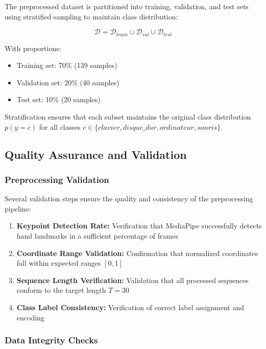 \documentclass[11pt, a4paper]{article}
\begin{document}
The preprocessed dataset is partitioned into training, validation, and test sets using stratified sampling to maintain class distribution:

\begin{equation}
\mathcal{D} = \mathcal{D}_{train} \cup \mathcal{D}_{val} \cup \mathcal{D}_{test}
\end{equation}

With proportions:
\begin{itemize}
    \item Training set: 70\% (139 samples)
    \item Validation set: 20\% (40 samples)
    \item Test set: 10\% (20 samples)
\end{itemize}

Stratification ensures that each subset maintains the original class distribution $p(y = c)$ for all classes $c \in \{clavier, disque\_dur, ordinateur, souris\}$.

\subsection{Quality Assurance and Validation}

\subsubsection{Preprocessing Validation}

Several validation steps ensure the quality and consistency of the preprocessing pipeline:

\begin{enumerate}
    \item \textbf{Keypoint Detection Rate:} Verification that MediaPipe successfully detects hand landmarks in a sufficient percentage of frames
    \item \textbf{Coordinate Range Validation:} Confirmation that normalized coordinates fall within expected ranges $[0, 1]$
    \item \textbf{Sequence Length Verification:} Validation that all processed sequences conform to the target length $T = 30$
    \item \textbf{Class Label Consistency:} Verification of correct label assignment and encoding
\end{enumerate}

\subsubsection{Data Integrity Checks}
\end{document}
